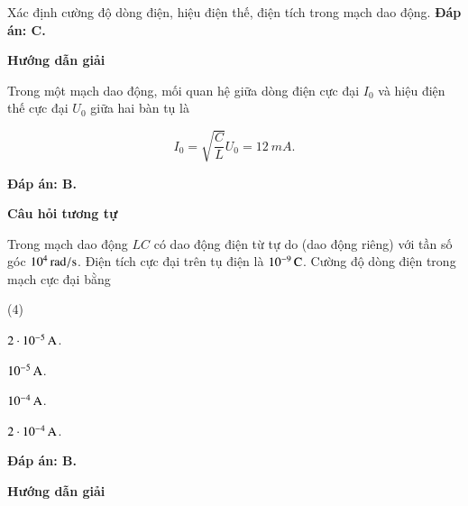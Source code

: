 \begin{dang}{Xác định cường độ dòng điện, hiệu điện thế, điện tích trong mạch dao động.}
{		\textbf{Đáp án: C.} 
	}
	{	\begin{center}
			\textbf{Hướng dẫn giải}
		\end{center}
		
		Trong một mạch dao động, mối quan hệ giữa dòng điện cực đại $I_{0}$ và hiệu điện thế cực đại $U_{0}$ giữa hai bàn tụ là
		
		$$I_{0}=\sqrt{\dfrac{C}{L}} U_{0}=  \SI{12}{mA}.$$
		
		\textbf{Đáp án: B.}
		
		
		\begin{center}
			\textbf{Câu hỏi tương tự}
		\end{center}
		
		Trong mạch dao động $LC$ có dao động điện từ tự do (dao động riêng) với tần số góc $\xsi{10^{4}}{rad/s}$. Điện tích cực đại trên tụ điện là $\xsi{10^{-9}}{C}$. Cường độ dòng điện trong mạch cực đại bằng
		\begin{mcq}(4)
			\item $\xsi{2\cdot10^{-5}}{A}$. 
			\item $\xsi{10^{-5}}{A}$. 
			\item $\xsi{10^{-4}}{A}$. 
			\item $\xsi{2\cdot10^{-4}}{A}$. 
		\end{mcq}
		
		\textbf{Đáp án: B.} 
	}
	{	\begin{center}
			\textbf{Hướng dẫn giải}
		\end{center}
		
}
\end{dang}
